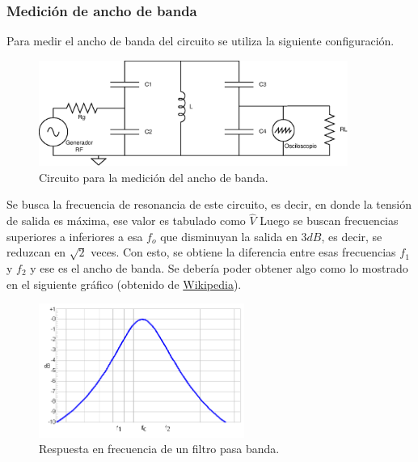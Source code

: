 \documentclass{article}
\begin{document}
\subsubsection{Medición de ancho de banda}
Para medir el ancho de banda del circuito se utiliza la siguiente configuración.
\begin{figure}[H]
\centering
\includegraphics[width=0.9\textwidth]{./img/figura27.eps}
\caption{Circuito para la medición del ancho de banda.}
\label{fig:circuito27}
\end{figure}
Se busca la frecuencia de resonancia de este circuito, es decir, en donde la tensión de salida es máxima, ese valor es tabulado como $\widehat{V}$ Luego se buscan frecuencias superiores a inferiores a esa $f_o$ que disminuyan la salida en $3 dB$, es decir, se reduzcan en $\sqrt{2}$ veces. Con esto, se obtiene la diferencia entre esas frecuencias $f_1$ y $f_2$ y ese es el ancho de banda. Se debería poder obtener algo como lo mostrado en el siguiente gráfico (obtenido de \href{https://es.wikipedia.org/wiki/Filtro_paso_banda}{Wikipedia}).
\begin{figure}[H]
\centering
\includegraphics[width=0.6\textwidth]{./img/figura28.png}
\caption{Respuesta en frecuencia de un filtro pasa banda.}
\label{fig:circuito28}
\end{figure}
\end{document}

